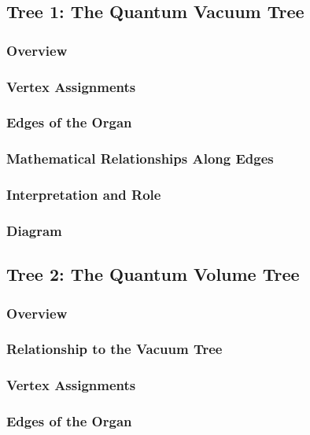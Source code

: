 \documentclass[12pt]{article}
\begin{document}

\subsection{Tree 1: The Quantum Vacuum Tree}
\subsubsection{Overview}
\subsubsection{Vertex Assignments}
\subsubsection{Edges of the Organ}
\subsubsection{Mathematical Relationships Along Edges}
\subsubsection{Interpretation and Role}
\subsubsection{Diagram}

\subsection{Tree 2: The Quantum Volume Tree}
\subsubsection{Overview}
\subsubsection{Relationship to the Vacuum Tree}
\subsubsection{Vertex Assignments}
\subsubsection{Edges of the Organ}
\end{document}

